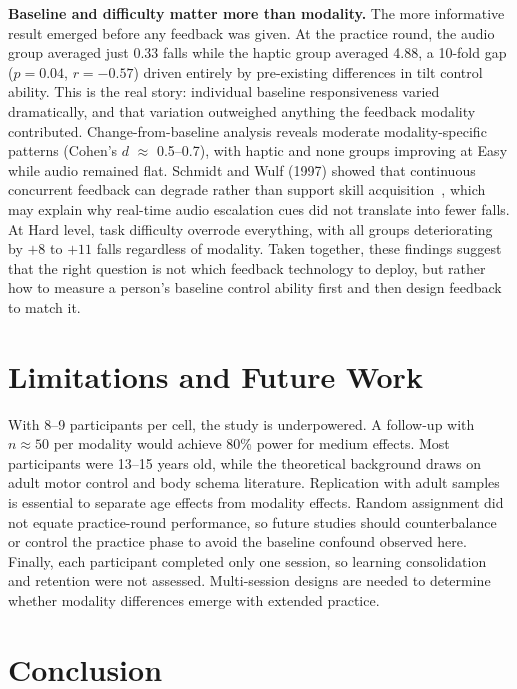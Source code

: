 \documentclass[sigconf]{acmart}
\begin{document}
\textbf{Baseline and difficulty matter more than modality.}
The more informative result emerged before any feedback was given. At the practice round, the audio group averaged just 0.33 falls while the haptic group averaged 4.88, a 10-fold gap ($p=0.04$, $r=-0.57$) driven entirely by pre-existing differences in tilt control ability. This is the real story: individual baseline responsiveness varied dramatically, and that variation outweighed anything the feedback modality contributed. Change-from-baseline analysis reveals moderate modality-specific patterns (Cohen's $d$ $\approx$ 0.5--0.7), with haptic and none groups improving at Easy while audio remained flat. Schmidt and Wulf (1997) showed that continuous concurrent feedback can degrade rather than support skill acquisition~\cite{continuous_schmidt_1997}, which may explain why real-time audio escalation cues did not translate into fewer falls. At Hard level, task difficulty overrode everything, with all groups deteriorating by $+8$ to $+11$ falls regardless of modality.
Taken together, these findings suggest that the right question is not which feedback technology to deploy, but rather how to measure a person's baseline control ability first and then design feedback to match it.

\section{Limitations and Future Work}

With 8--9 participants per cell, the study is underpowered. A follow-up with $n \approx 50$ per modality would achieve 80\% power for medium effects.
Most participants were 13--15 years old, while the theoretical background draws on adult motor control and body schema literature. Replication with adult samples is essential to separate age effects from modality effects.
Random assignment did not equate practice-round performance, so future studies should counterbalance or control the practice phase to avoid the baseline confound observed here.
Finally, each participant completed only one session, so learning consolidation and retention were not assessed. Multi-session designs are needed to determine whether modality differences emerge with extended practice.

\section{Conclusion}
\end{document}
